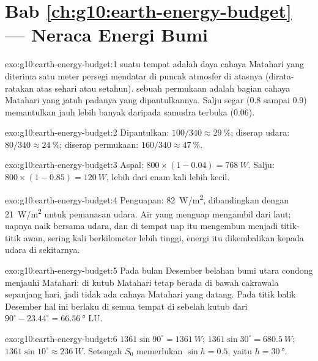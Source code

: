 \section*{Bab \ref{ch:g10:earth-energy-budget} --- Neraca Energi Bumi}

\begin{solution}{exo:g10:earth-energy-budget:1}
 suatu tempat adalah daya cahaya Matahari yang diterima satu meter
persegi mendatar di puncak atmosfer di atasnya (dirata-ratakan atas sehari
atau setahun).  sebuah permukaan adalah bagian cahaya Matahari yang
jatuh padanya yang dipantulkannya. Salju segar (0.8 sampai 0.9) memantulkan
jauh lebih banyak daripada samudra terbuka (0.06).
\end{solution}

\begin{solution}{exo:g10:earth-energy-budget:2}
Dipantulkan: $100/340 \approx \qty{29}{\percent}$; diserap udara:
$80/340 \approx \qty{24}{\percent}$; diserap permukaan: $160/340
\approx \qty{47}{\percent}$.
\end{solution}

\begin{solution}{exo:g10:earth-energy-budget:3}
Aspal: $800 \times (1 - 0.04) = \qty{768}{W}$. Salju: $800 \times (1 -
0.85) = \qty{120}{W}$, lebih dari enam kali lebih kecil.
\end{solution}

\begin{solution}{exo:g10:earth-energy-budget:4}
Penguapan: \qty{82}{W/m^2}, dibandingkan dengan \qty{21}{W/m^2} untuk
pemanasan udara. Air yang menguap mengambil  dari laut; uapnya
naik bersama udara, dan di tempat uap itu mengembun menjadi titik-titik awan,
sering kali berkilometer lebih tinggi, energi itu dikembalikan kepada udara di
sekitarnya.
\end{solution}

\begin{solution}{exo:g10:earth-energy-budget:5}
Pada bulan Desember belahan bumi utara condong menjauhi Matahari: di kutub
Matahari tetap berada di bawah cakrawala sepanjang hari, jadi tidak ada cahaya
Matahari yang datang. Pada titik balik Desember hal ini berlaku di semua tempat
di sebelah kutub dari $90^\circ - 23.44^\circ =
\qty{66.56}{\degree}$ LU.
\end{solution}

\begin{solution}{exo:g10:earth-energy-budget:6}
$1361 \sin 90^\circ = \qty{1361}{W}$; $1361 \sin 30^\circ =
\qty{680.5}{W}$; $1361 \sin 10^\circ \approx \qty{236}{W}$. Setengah $S_0$
memerlukan $\sin h = 0.5$, yaitu $h = \qty{30}{\degree}$.
\end{solution}

